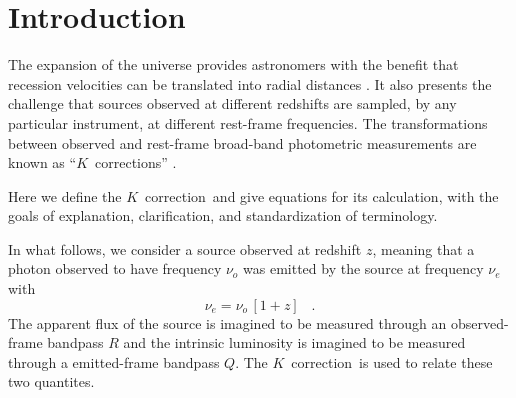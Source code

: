 \documentclass[preprint]{aastex}
\newcommand{\kcorrection}{$K$~correction}
\newcommand{\kcorrections}{{\kcorrection}s}
\newcommand{\nuobs}{\nu_o}
\newcommand{\nuemit}{\nu_e}
\begin{document}
\title{\scalebox{1.5}{The \kcorrection}}
\author{
  David W. Hogg,
  Michael Blanton,
  Daniel J. Eisenstein,
  and Ivan K. Baldry\\
  \textsl{fourth draft---2002 August 15}
}

\begin{abstract}
The \kcorrection\ is used to relate the emitted- or rest-frame
absolute magnitude of a source in one broad photometric bandpass to
the observed-frame apparent magnitude of the same source in another
broad bandpass.  This short paper provides definitions, equations and
pedagogical discussion related to the \kcorrection.
\end{abstract}

\section{Introduction}

The expansion of the universe provides astronomers with the benefit
that recession velocities can be translated into radial distances
\citep[eg,][and references therein]{hogg99cosm}.  It also presents the
challenge that sources observed at different redshifts are sampled, by
any particular instrument, at different rest-frame frequencies.  The
transformations between observed and rest-frame broad-band photometric
measurements are known as ``\kcorrections'' \citep*{humason56a,
oke68a}.

Here we define the \kcorrection\ and give equations for its
calculation, with the goals of explanation, clarification, and
standardization of terminology.

In what follows, we consider a source observed at redshift $z$,
meaning that a photon observed to have frequency $\nuobs$ was emitted
by the source at frequency $\nuemit$ with
\begin{equation}
\nuemit = \nuobs\,[1+z] \;\;\;.
\end{equation}
The apparent flux of the source is imagined to be measured through an
observed-frame bandpass $R$ and the intrinsic luminosity is imagined
to be measured through a emitted-frame bandpass $Q$.  The
\kcorrection\ is used to relate these two quantites.
\end{document}
